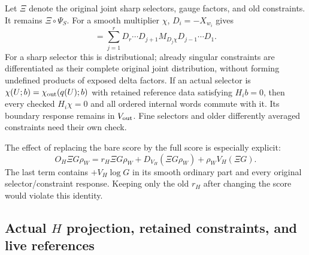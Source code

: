 \documentclass[11pt,letterpaper]{article}
\theoremstyle{plain}
\theoremstyle{remark}\newtheorem{remark}[theorem]{Scope}
\begin{document}
Let $\Xi$ denote the original joint sharp selectors, gauge factors, and old
constraints. It remains $\Xi\circ\Psi_S$. For a smooth multiplier $\chi$,
$D_i=-X_{w_i}$ gives
\begin{equation}
[D_r\cdots D_1,\chi]
=\sum_{j=1}^r D_r\cdots D_{j+1}M_{D_j\chi}D_{j-1}\cdots D_1.
\label{eq:boundarycommutator}
\end{equation}
For a sharp selector this is distributional; already singular constraints are
differentiated as their complete original joint distribution, without forming
undefined products of exposed delta factors. If an actual selector is
$\chi(U;b)=\chi_{\rm out}(q(U);b)$ with retained reference data satisfying
$H_i b=0$, then every checked $H_i\chi=0$ and all
ordered internal words commute with it. Its boundary response remains in
$V_{\rm out}$. Fine selectors and older differently averaged constraints need
their own check.

The effect of replacing the bare score by the full score is especially explicit:
\begin{equation}
O_H\Xi G\rho_W
=r_H\Xi G\rho_W+D_{V_H}(\Xi G\rho_W)+\rho_WV_H(\Xi G).
\label{eq:historycorrection}
\end{equation}
The last term contains $+V_H\log G$ in its smooth ordinary part and every original
selector/constraint response. Keeping only the old $r_H$ after changing the score
would violate this identity.

\subsection{Actual $H$ projection, retained constraints, and live references}
\end{document}
